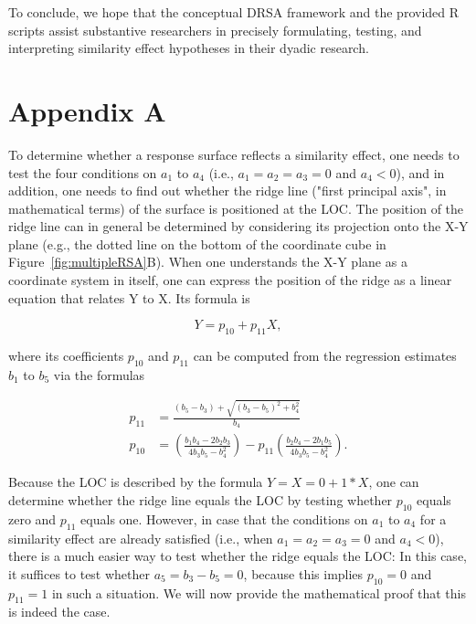 \documentclass[jou,a4paper,draftfirst]{apa6}
\begin{document}
To conclude, we hope that the conceptual DRSA framework and the provided R scripts assist substantive researchers in precisely formulating, testing, and interpreting similarity effect hypotheses in their dyadic research.

\printbibliography


\section{Appendix A}

To determine whether a response surface reflects a similarity effect, one needs to test the four conditions on $a_1$ to $a_4$ (i.e., $a_1 = a_2 = a_3 = 0$ and $a_4 < 0$), and in addition, one needs to find out whether the ridge line ("first principal axis", in mathematical terms) of the surface is positioned at the LOC. The position of the ridge line can in general be determined by considering its projection onto the X-Y plane (e.g., the dotted line on the bottom of the coordinate cube in Figure~\ref{fig:multipleRSA}B). When one understands the X-Y plane as a coordinate system in itself, one can express the position of the ridge as a linear equation that relates Y to X. Its formula is \parencite[see][]{Edwards2007}

\begin{equation}
Y = p_{10} + p_{11}X,
\end{equation}

where its coefficients $p_{10}$ and $p_{11}$ can be computed from the regression estimates $b_1$ to $b_5$ via the formulas

\begin{align}
p_{11} &= 
\frac{(b_5 - b_3) + \sqrt{(b_3-b_5)^2 + b_{4}^{2}}}{b_4} \nonumber \\[0.3cm]
p_{10} &= \left(\frac{b_1b_4 - 2b_2b_3}{4b_3b_5 - b_{4}^{2}}\right) - p_{11} \left( \frac{b_2b_4 - 2b_1b_5}{4b_3b_5 - b_{4}^{2}} \right) \nonumber.
\end{align}

Because the LOC is described by the formula $Y = X = 0 + 1*X$, one can determine whether the ridge line equals the LOC by testing whether $p_{10}$ equals zero and $p_{11}$ equals one. However, in case that the conditions on $a_1$ to $a_4$ for a similarity effect are already satisfied (i.e., when $a_1 = a_2 = a_3 = 0$ and $a_4 < 0$), there is a much easier way to test whether the ridge equals the LOC: In this case, it suffices to test whether $a_5 = b_3 - b_5 = 0$, because this implies $p_{10} = 0$ and $p_{11} = 1$ in such a situation. We will now provide the mathematical proof that this is indeed the case. 
\end{document}

